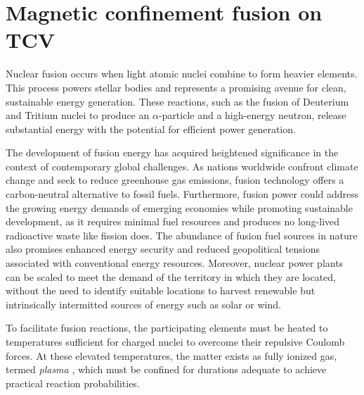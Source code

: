 \section{Magnetic confinement fusion on TCV}
\label{sec:tokamaks_intro}
Nuclear fusion occurs when light atomic nuclei combine to form heavier elements. This process powers stellar bodies and represents a promising avenue for clean, sustainable energy generation. These reactions, such as the fusion of Deuterium and Tritium nuclei to produce an $\alpha$-particle and a high-energy neutron, release substantial energy with the potential for efficient power generation.

The development of fusion energy has acquired heightened significance in the context of contemporary global challenges. As nations worldwide confront climate change and seek to reduce greenhouse gas emissions, fusion technology offers a carbon-neutral alternative to fossil fuels. Furthermore, fusion power could address the growing energy demands of emerging economies while promoting sustainable development, as it requires minimal fuel resources and produces no long-lived radioactive waste like fission does. The abundance of fusion fuel sources in nature also promises enhanced energy security and reduced geopolitical tensions associated with conventional energy resources. Moreover, nuclear power plants can be scaled to meet the demand of the territory in which they are located, without the need to identify suitable locations to harvest renewable but intrinsically intermitted sources of energy such as solar or wind.

To facilitate fusion reactions, the participating elements must be heated to temperatures sufficient for charged nuclei to overcome their repulsive Coulomb forces. At these elevated temperatures, the matter exists as fully ionized gas, termed \emph{plasma} \cite{chen_introduction_2012}, which must be confined for durations adequate to achieve practical reaction probabilities.

